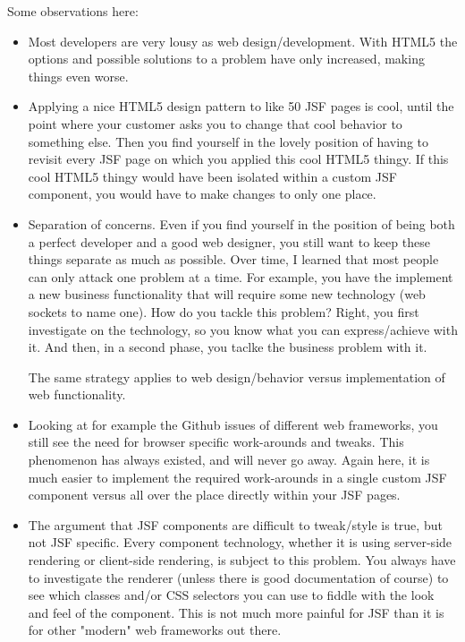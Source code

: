 Some observations here:
\begin{itemize}
	\item Most developers are very lousy as web design/development. With HTML5 the options and possible solutions to a problem have only increased, making things even worse.
	\item Applying a nice HTML5 design pattern to like 50 JSF pages is cool, until the point where your customer asks you to change that cool behavior to something else. Then you find yourself in the lovely position of having to revisit every JSF page on which you applied this cool HTML5 thingy.
	If this cool HTML5 thingy would have been isolated within a custom JSF component, you would have to make changes to only one place.
	\item Separation of concerns. Even if you find yourself in the position of being both a perfect developer and a good web designer, you still want to keep these things separate as much as possible.
	Over time, I learned that most people can only attack one problem at a time.
	For example, you have the implement a new business functionality that will require some new technology (web sockets to name one).
	How do you tackle this problem? Right, you first investigate on the technology, so you know what you can express/achieve with it.
	And then, in a second phase, you taclke the business problem with it.
	
	The same strategy applies to web design/behavior versus implementation of web functionality.
	
	\item Looking at for example the Github issues of different web frameworks,
	you still see the need for browser specific work-arounds and tweaks.
	This phenomenon has always existed, and will never go away.
	Again here, it is much easier to implement the required work-arounds in a single custom JSF component versus all over the place directly within your JSF pages.
	
	\item The argument that JSF components are difficult to tweak/style is true, but not JSF specific.
	Every component technology, whether it is using server-side rendering or client-side rendering,
	is subject to this problem.
	You always have to investigate the renderer (unless there is good documentation of course)
	to see which classes and/or CSS selectors you can use to fiddle with the look and feel of the component.
	This is not much more painful for JSF than it is for other "modern" web frameworks out there.
\end{itemize}

